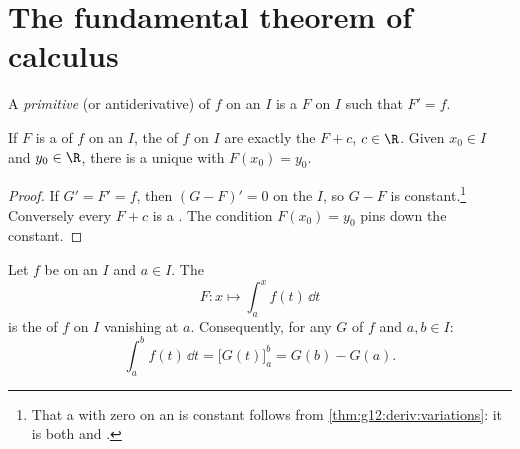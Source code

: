\section{The fundamental theorem of calculus}

\begin{definition}[Primitive]\label{def:g12:integ:primitive}
A \emph{primitive} (or antiderivative) of $f$ on an 
$I$ is a   $F$ on $I$ such that $F' = f$.
\end{definition}

\begin{proposition}\label{prop:g12:integ:primunique}
If $F$ is a  of $f$ on an  $I$, the  of $f$ on
$I$ are exactly the  $F + c$, $c \in \R$. Given $x_0 \in I$ and
$y_0 \in \R$, there is a unique  with $F(x_0) = y_0$.
\end{proposition}

\begin{proof}
If $G' = F' = f$, then $(G - F)' = 0$ on the  $I$, so $G - F$ is
constant.\footnote{That a  with zero  on an  is
constant follows from \cref{thm:g12:deriv:variations}: it is both 
and .} Conversely every $F + c$ is a . The condition
$F(x_0) = y_0$ pins down the constant.
\end{proof}

\begin{theorem}\label{thm:g12:integ:ftc}
Let $f$ be  on an  $I$ and $a \in I$. The 
\[
F \colon x \longmapsto \int_a^x f(t)\,\dd t
\]
is the  of $f$ on $I$ vanishing at $a$. Consequently, for any
 $G$ of $f$ and $a, b \in I$:
\[
\int_a^b f(t)\,\dd t = \bigl[G(t)\bigr]_a^b = G(b) - G(a).
\]
\end{theorem}

